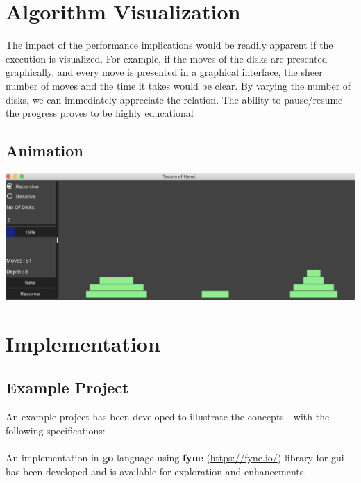 \documentclass[a4paper,11pt]{article}
\theoremstyle{mytheor}
\begin{document}
\section*{Algorithm Visualization}

The impact of the performance implications would be readily apparent if the execution is visualized. For example, if the moves of the disks are presented graphically, and every move is presented in a graphical interface, the sheer number of moves and the time it takes would be clear. By varying the number of disks, we can immediately appreciate the relation. The ability 
to pause/resume the progress proves to be highly educational

\subsection*{Animation}
\includegraphics[width=6in]{TowersOfHanoi.png}

\section*{Implementation}

\subsection*{Example Project}

An example project has been developed to illustrate the concepts - with the following specifications:
\paragraph{}

\paragraph{}

An implementation in \textbf{go} language using \textbf{fyne} (\url{https://fyne.io/}) library for gui has been developed and is available for exploration and enhancements.

\end{document}

